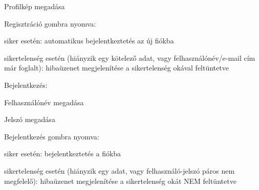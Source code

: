 \begin{compactitem}
\begin{compactitem}
		\item Profilkép megadása
		\item Regisztráció gombra nyomva:
		\begin{compactitem}
			\item siker esetén: automatikus bejelentkeztetés az új fiókba
			\item sikertelenség esetén (hiányzik egy kötelező adat, vagy felhasználónév/e-mail cím már foglalt): hibaüzenet megjelenítése a sikertelenség okával feltüntetve
		\end{compactitem}
	\end{compactitem}
	\item Bejelentkezés:
	\begin{compactitem}
		\item Felhasználónév megadása
		\item Jelszó megadása
		\item Bejelentkezés gombra nyomva:
		\begin{compactitem}
			\item siker esetén: bejelentkeztetés a fiókba
			\item sikertelenség esetén (hiányzik egy adat, vagy felhasználó-jelszó páros nem megfelelő): hibaüzenet megjelenítése a sikertelenség okát NEM feltüntetve
		\end{compactitem}
	\end{compactitem}
\end{compactitem}

